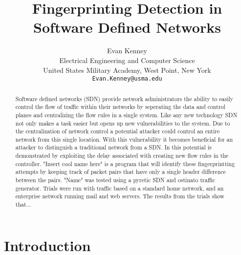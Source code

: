 \documentclass[twocolumn]{article}
\begin{document}
\title{Fingerprinting Detection in Software Defined Networks}
\author{Evan Kenney\\
	Electrical Engineering and Computer Science\\
	United States Military Academy, West Point, New York\\
	\texttt{Evan.Kenney@usma.edu}}
\maketitle

\begin{abstract}

Software defined networks (SDN) provide network administrators the ability to easily control the flow of traffic within their networks by seperating the data and control planes and centralizing the flow rules in a single system. Like any new technology SDN not only makes a task easier but opens up new vulnerabilities to the system. Due to the centralization of network control a potential attacker could control an entire network from this single location. With this vulnerability it becomes beneficial for an attacker to distinguish a traditional network from a SDN. In \cite{Gu13} this potential is demonstrated by exploiting the delay associated with creating new flow rules in the controller. "Insert cool name here" is a program that will identify these fingerprintting attempts by keeping track of packet pairs that have only a single header difference between the pairs. "Name" was tested using a pyretic SDN and ostinato traffic generator. Trials were run with traffic based on a standard home network, and an enterprise network running mail and web servers. The results from the trials show that...

\end{abstract}

\section{Introduction}
\end{document}
